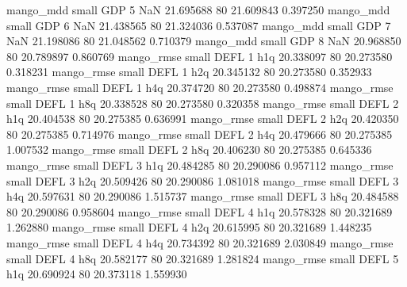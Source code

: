         mango_mdd      small      GDP                 5                  NaN 21.695688 80      21.609843           0.397250
        mango_mdd      small      GDP                 6                  NaN 21.438565 80      21.324036           0.537087
        mango_mdd      small      GDP                 7                  NaN 21.198086 80      21.048562           0.710379
        mango_mdd      small      GDP                 8                  NaN 20.968850 80      20.789897           0.860769
       mango_rmse      small     DEFL                 1                  h1q 20.338097 80      20.273580           0.318231
       mango_rmse      small     DEFL                 1                  h2q 20.345132 80      20.273580           0.352933
       mango_rmse      small     DEFL                 1                  h4q 20.374720 80      20.273580           0.498874
       mango_rmse      small     DEFL                 1                  h8q 20.338528 80      20.273580           0.320358
       mango_rmse      small     DEFL                 2                  h1q 20.404538 80      20.275385           0.636991
       mango_rmse      small     DEFL                 2                  h2q 20.420350 80      20.275385           0.714976
       mango_rmse      small     DEFL                 2                  h4q 20.479666 80      20.275385           1.007532
       mango_rmse      small     DEFL                 2                  h8q 20.406230 80      20.275385           0.645336
       mango_rmse      small     DEFL                 3                  h1q 20.484285 80      20.290086           0.957112
       mango_rmse      small     DEFL                 3                  h2q 20.509426 80      20.290086           1.081018
       mango_rmse      small     DEFL                 3                  h4q 20.597631 80      20.290086           1.515737
       mango_rmse      small     DEFL                 3                  h8q 20.484588 80      20.290086           0.958604
       mango_rmse      small     DEFL                 4                  h1q 20.578328 80      20.321689           1.262880
       mango_rmse      small     DEFL                 4                  h2q 20.615995 80      20.321689           1.448235
       mango_rmse      small     DEFL                 4                  h4q 20.734392 80      20.321689           2.030849
       mango_rmse      small     DEFL                 4                  h8q 20.582177 80      20.321689           1.281824
       mango_rmse      small     DEFL                 5                  h1q 20.690924 80      20.373118           1.559930
